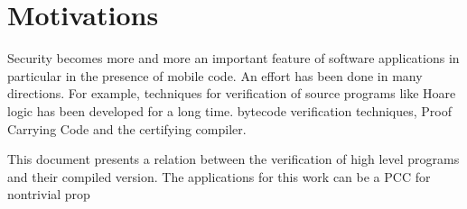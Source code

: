 
\section{Motivations}

Security becomes more and more an important feature of software applications in particular in the presence of mobile code.
 An effort has been done in many directions. For example,
 techniques for verification of source programs like Hoare logic has been developed for a long time.   
 bytecode verification techniques, Proof Carrying Code and the certifying compiler.  

This document presents a relation between the verification of high level programs and their compiled version. 
The applications for this work can be a PCC for nontrivial prop 
